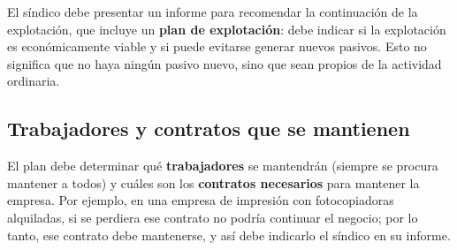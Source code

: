 \documentclass[12pt,oneside]{book}
\begin{document}
El síndico debe presentar un informe para recomendar la continuación de la explotación, que incluye un \textbf{plan de explotación}: debe indicar si la explotación es económicamente viable y si puede evitarse generar nuevos pasivos. Esto no significa que no haya ningún pasivo nuevo, sino que sean propios de la actividad ordinaria.

\subsection{Trabajadores y contratos que se mantienen}

El plan debe determinar qué \textbf{trabajadores} se mantendrán (siempre se procura mantener a todos) y cuáles son los \textbf{contratos necesarios} para mantener la empresa. Por ejemplo, en una empresa de impresión con fotocopiadoras alquiladas, si se perdiera ese contrato no podría continuar el negocio; por lo tanto, ese contrato debe mantenerse, y así debe indicarlo el síndico en su informe.
\end{document}
